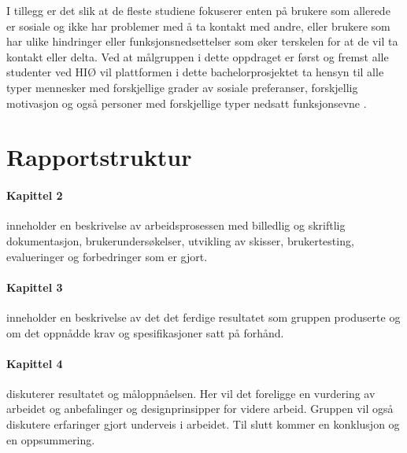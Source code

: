 I tillegg er det slik at de fleste studiene fokuserer enten på brukere som allerede er sosiale og ikke har problemer med å ta kontakt med andre, eller brukere som har ulike hindringer eller funksjonsnedsettelser som øker terskelen for at de vil ta kontakt eller delta. Ved at målgruppen i dette oppdraget er først og fremst alle studenter ved HIØ vil plattformen i dette bachelorprosjektet ta hensyn til alle typer mennesker med forskjellige grader av sosiale preferanser, forskjellig motivasjon og også personer med forskjellige typer nedsatt funksjonsevne .

\section{Rapportstruktur}
\paragraph{Kapittel 2} inneholder en beskrivelse av arbeidsprosessen med billedlig og skriftlig dokumentasjon, brukerundersøkelser, utvikling av skisser, brukertesting, evalueringer og forbedringer som er gjort.

\paragraph{Kapittel 3}
inneholder en beskrivelse av det det ferdige resultatet som gruppen produserte og om det oppnådde krav og spesifikasjoner satt på forhånd.

\paragraph{Kapittel 4}
diskuterer resultatet og måloppnåelsen. Her vil det foreligge en vurdering av arbeidet og anbefalinger og designprinsipper for videre arbeid. Gruppen vil også diskutere erfaringer gjort underveis i arbeidet. Til slutt kommer en konklusjon og en oppsummering.

